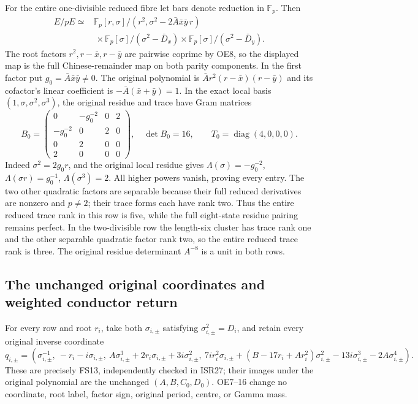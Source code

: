 \documentclass[11pt]{article}
\begin{document}
For the entire one-divisible reduced fibre let bars denote
reduction in $\mathbb F_p$. Then
\begin{equation}
 \begin{aligned}
 E/pE\simeq{}&
 \mathbb F_p[r,\sigma]/(r^2,\sigma^2-2\bar A\bar x\bar y\,r)
 \\&\ \times\mathbb F_p[\sigma]/(\sigma^2-\bar D_x)
 \times\mathbb F_p[\sigma]/(\sigma^2-\bar D_y).
 \end{aligned}                                          \tag{OE15}
\end{equation}
The root factors $r^2,r-\bar x,r-\bar y$ are pairwise coprime
by OE8, so the displayed map is the full Chinese-remainder map
on both parity components. In the first factor put
$g_0=\bar A\bar x\bar y\ne0$. The original polynomial is
$\bar A r^2(r-\bar x)(r-\bar y)$ and its cofactor's linear
coefficient is $-\bar A(\bar x+\bar y)=1$. In the exact local
basis $(1,\sigma,\sigma^2,\sigma^3)$, the original residue and
trace have Gram matrices
\begin{equation}
 B_0=\begin{pmatrix}
 0&-g_0^{-2}&0&2\\-g_0^{-2}&0&2&0\\0&2&0&0\\2&0&0&0
 \end{pmatrix},\quad \det B_0=16,\qquad
 T_0=\operatorname{diag}(4,0,0,0).                     \tag{OE16}
\end{equation}
Indeed $\sigma^2=2g_0r$, and the original local residue gives
$\Lambda(\sigma)=-g_0^{-2}$, $\Lambda(\sigma r)=g_0^{-1}$,
$\Lambda(\sigma^3)=2$. All higher powers vanish, proving every
entry. The two other quadratic factors are separable because
their full reduced derivatives are nonzero and $p\ne2$; their
trace forms each have rank two. Thus the entire reduced trace
rank in this row is five, while the full eight-state residue
pairing remains perfect. In the two-divisible row the length-six
cluster has trace rank one and the other separable quadratic
factor rank two, so the entire reduced trace rank is three.
The original residue determinant $A^{-8}$ is a unit in both rows.

\subsection{The unchanged original coordinates and weighted conductor return}
For every row and root $r_i$, take both $\sigma_{i,\pm}$ satisfying
$\sigma_{i,\pm}^2=D_i$, and retain every original inverse coordinate
\begin{equation}
 q_{i,\pm}=\left(
 \sigma_{i,\pm}^{-1},\ -r_i-i\sigma_{i,\pm},\
 A\sigma_{i,\pm}^3+2r_i\sigma_{i,\pm}+3i\sigma_{i,\pm}^2,\
 7ir_i^2\sigma_{i,\pm}
 +(B-17r_i+Ar_i^2)\sigma_{i,\pm}^2
 -13i\sigma_{i,\pm}^3-2A\sigma_{i,\pm}^4\right).
                                                               \tag{OE17}
\end{equation}
These are precisely FS13, independently checked in ISR27; their
images under the original polynomial are the unchanged
$(A,B,C_0,D_0)$. OE7--16 change no coordinate, root label,
factor sign, original period, centre, or Gamma mass.
\end{document}
